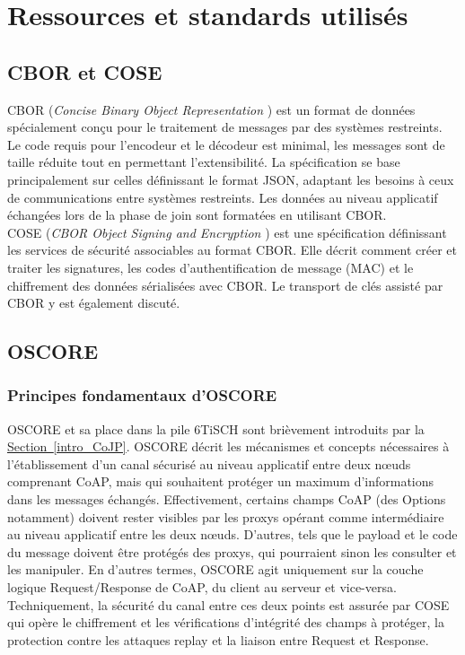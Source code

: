\documentclass[]{report}
\newcommand{\wordlink}[2]{\hyperref[#2]{#1~\ref{#2}}}
\begin{document}
\section{Ressources et standards utilisés}

\subsection{CBOR et COSE}

CBOR (\textit{Concise Binary Object Representation} \cite{rfc7049}) est un format de données spécialement conçu pour le traitement de messages par des systèmes restreints. Le code requis pour l'encodeur et le décodeur est minimal, les messages sont de taille réduite tout en permettant l'extensibilité. La spécification se base principalement sur celles définissant le format JSON, adaptant les besoins à ceux de communications entre systèmes restreints. Les données au niveau applicatif échangées lors de la phase de join sont formatées en utilisant CBOR.\\

COSE (\textit{CBOR Object Signing and Encryption} \cite{rfc8152}) est une spécification définissant les services de sécurité associables au format CBOR. Elle décrit comment créer et traiter les signatures, les codes d'authentification de message (MAC) et le chiffrement des données sérialisées avec CBOR. Le transport de clés assisté par CBOR y est également discuté.

\subsection{OSCORE}

\subsubsection{Principes fondamentaux d'OSCORE}

OSCORE \cite{rfc8613} et sa place dans la pile 6TiSCH sont brièvement introduits par la \wordlink{Section}{intro_CoJP}. OSCORE décrit les mécanismes et concepts nécessaires à l'établissement d'un canal sécurisé au niveau applicatif entre deux nœuds comprenant CoAP, mais qui souhaitent protéger un maximum d'informations dans les messages échangés. Effectivement, certains champs CoAP (des Options notamment) doivent rester visibles par les proxys opérant comme intermédiaire au niveau applicatif entre les deux nœuds. D'autres, tels que le payload et le code du message doivent être protégés des proxys, qui pourraient sinon les consulter et les manipuler. En d'autres termes, OSCORE agit uniquement sur la couche logique Request/Response de CoAP, du client au serveur et vice-versa. Techniquement, la sécurité du canal entre ces deux points est assurée par COSE qui opère le chiffrement et les vérifications d'intégrité des champs à protéger, la protection contre les attaques replay et la liaison entre Request et Response.\\
\end{document}
